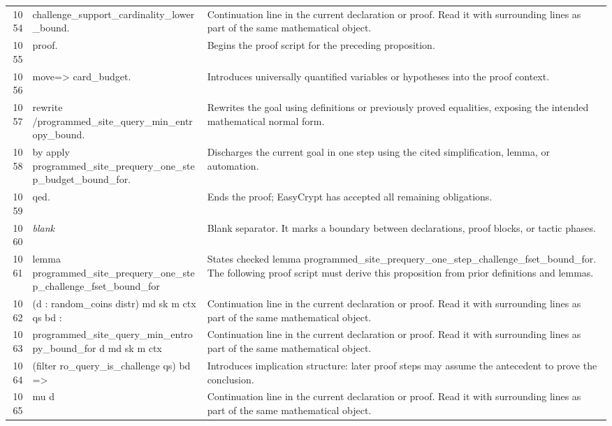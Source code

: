 \documentclass[10pt]{article}
\begin{document}
\begin{longtable}{r L{0.53\textwidth} L{0.37\textwidth}}
1054 & {\ttfamily\scriptsize     challenge\_support\_cardinality\_lower\_bound.} & Continuation line in the current declaration or proof.  Read it with surrounding lines as part of the same mathematical object. \\
1055 & {\ttfamily\scriptsize proof.} & Begins the proof script for the preceding proposition. \\
1056 & {\ttfamily\scriptsize move=> card\_budget.} & Introduces universally quantified variables or hypotheses into the proof context. \\
1057 & {\ttfamily\scriptsize rewrite /programmed\_site\_query\_min\_entropy\_bound.} & Rewrites the goal using definitions or previously proved equalities, exposing the intended mathematical normal form. \\
1058 & {\ttfamily\scriptsize by apply programmed\_site\_prequery\_one\_step\_budget\_bound\_for.} & Discharges the current goal in one step using the cited simplification, lemma, or automation. \\
1059 & {\ttfamily\scriptsize qed.} & Ends the proof; EasyCrypt has accepted all remaining obligations. \\
1060 & {\ttfamily\scriptsize \emph{blank}} & Blank separator.  It marks a boundary between declarations, proof blocks, or tactic phases. \\
1061 & {\ttfamily\scriptsize lemma programmed\_site\_prequery\_one\_step\_challenge\_fset\_bound\_for} & States checked lemma programmed\_site\_prequery\_one\_step\_challenge\_fset\_bound\_for.  The following proof script must derive this proposition from prior definitions and lemmas. \\
1062 & {\ttfamily\scriptsize   (d : random\_coins distr) md sk m ctx qs bd :} & Continuation line in the current declaration or proof.  Read it with surrounding lines as part of the same mathematical object. \\
1063 & {\ttfamily\scriptsize   programmed\_site\_query\_min\_entropy\_bound\_for d md sk m ctx} & Continuation line in the current declaration or proof.  Read it with surrounding lines as part of the same mathematical object. \\
1064 & {\ttfamily\scriptsize     (filter ro\_query\_is\_challenge qs) bd =>} & Introduces implication structure: later proof steps may assume the antecedent to prove the conclusion. \\
1065 & {\ttfamily\scriptsize   mu d} & Continuation line in the current declaration or proof.  Read it with surrounding lines as part of the same mathematical object. \\

\end{longtable}
\end{document}

